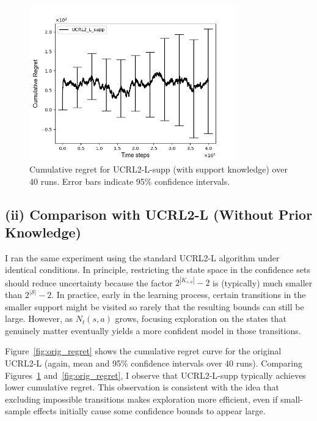 \begin{figure}[H]
  \centering
  \includegraphics[width=0.8\textwidth]{Code/4/Figure_UCRL2_L_supp_cumulative_regret_supp.png}
  \caption{Cumulative regret for UCRL2-L-supp (with support knowledge) over 40 runs. Error bars indicate 95\% confidence intervals.}
  \label{fig:supp_regret}
\end{figure}

\subsection*{(ii) Comparison with UCRL2-L (Without Prior Knowledge)}

I ran the same experiment using the standard UCRL2-L algorithm under identical conditions. In principle, restricting the state space in the confidence sets should reduce uncertainty because the factor $2^{|K_{s,a}|}-2$ is (typically) much smaller than $2^{|\mathcal{S}|}-2$. In practice, early in the learning process, certain transitions in the smaller support might be visited so rarely that the resulting bounds can still be large. However, as $N_t(s,a)$ grows, focusing exploration on the states that genuinely matter eventually yields a more confident model in those transitions.

Figure~\ref{fig:orig_regret} shows the cumulative regret curve for the original UCRL2-L (again, mean and 95\% confidence intervals over 40 runs). Comparing Figures~\ref{fig:supp_regret} and~\ref{fig:orig_regret}, I observe that UCRL2-L-supp typically achieves lower cumulative regret. This observation is consistent with the idea that excluding impossible transitions makes exploration more efficient, even if small-sample effects initially cause some confidence bounds to appear large.

